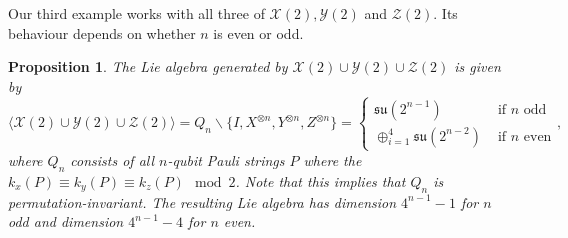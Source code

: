 \documentclass[12pt, a4-paper]{amsart}
\newcommand{\cX}{\mathcal{X}}
\newcommand{\cY}{\mathcal{Y}}
\newcommand{\cZ}{\mathcal{Z}}
\newcommand{\mf}[1]{\mathfrak{#1}}
\numberwithin{equation}{section}
\newtheorem{prop}[lemma]{Proposition}
\begin{document}
Our third example works with all three of $\cX(2), \cY(2)$ and $\cZ(2)$. Its behaviour depends on whether $n$ is even or odd.
\begin{prop}\label{prop:X2_Y2_Z2}
    The Lie algebra generated by $\cX(2) \cup \cY(2) \cup \cZ(2)$ is given by
    \begin{equation}
        \langle \cX(2) \cup \cY(2) \cup \cZ(2) \rangle
        = Q_n \backslash \{I, X^{\otimes n}, Y^{\otimes n}, Z^{\otimes n} \} = \begin{cases}
            \mf{su}(2^{n-1}) &\text{ if $n$ odd} \\
            \oplus_{i=1}^{4}\mf{su}(2^{n-2}) &\text{ if $n$ even}
        \end{cases},
    \end{equation}
    where $Q_n$ consists of all $n$-qubit Pauli strings $P$ where the $k_x(P) \equiv k_y(P) \equiv k_z(P) \mod{2}$. Note that this implies that $Q_n$ is permutation-invariant. The resulting Lie algebra has dimension $4^{n-1}-1$ for $n$ odd and dimension $4^{n-1}-4$ for $n$ even.
\end{prop}
\end{document}
